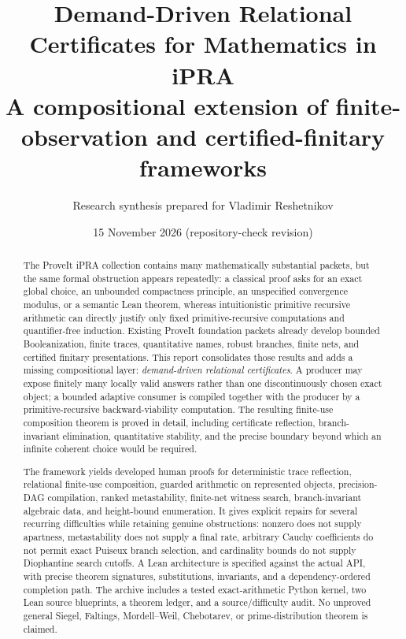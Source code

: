 \documentclass[11pt]{article}
\title{\textbf{Demand-Driven Relational Certificates for Mathematics in iPRA}\\[0.4em]
\large A compositional extension of finite-observation and certified-finitary frameworks}
\author{Research synthesis prepared for Vladimir Reshetnikov}
\date{15 November 2026 (repository-check revision)}
\newcommand{\code}[1]{\texttt{\detokenize{#1}}}
\begin{document}
\maketitle

\begin{abstract}
The ProveIt iPRA collection contains many mathematically substantial packets, but the same formal obstruction appears repeatedly: a classical proof asks for an exact global choice, an unbounded compactness principle, an unspecified convergence modulus, or a semantic Lean theorem, whereas intuitionistic primitive recursive arithmetic can directly justify only fixed primitive-recursive computations and quantifier-free induction. Existing ProveIt foundation packets already develop bounded Booleanization, finite traces, quantitative names, robust branches, finite nets, and certified finitary presentations. This report consolidates those results and adds a missing compositional layer: \emph{demand-driven relational certificates}. A producer may expose finitely many locally valid answers rather than one discontinuously chosen exact object; a bounded adaptive consumer is compiled together with the producer by a primitive-recursive backward-viability computation. The resulting finite-use composition theorem is proved in detail, including certificate reflection, branch-invariant elimination, quantitative stability, and the precise boundary beyond which an infinite coherent choice would be required.

The framework yields developed human proofs for deterministic trace reflection, relational finite-use composition, guarded arithmetic on represented objects, precision-DAG compilation, ranked metastability, finite-net witness search, branch-invariant algebraic data, and height-bound enumeration. It gives explicit repairs for several recurring difficulties while retaining genuine obstructions: nonzero does not supply apartness, metastability does not supply a final rate, arbitrary Cauchy coefficients do not permit exact Puiseux branch selection, and cardinality bounds do not supply Diophantine search cutoffs. A Lean architecture is specified against the actual \code{ConciseIPRA} API, with precise theorem signatures, substitutions, invariants, and a dependency-ordered completion path. The archive includes a tested exact-arithmetic Python kernel, two Lean source blueprints, a theorem ledger, and a source/difficulty audit. No unproved general Siegel, Faltings, Mordell--Weil, Chebotarev, or prime-distribution theorem is claimed.
\end{abstract}
\end{document}
